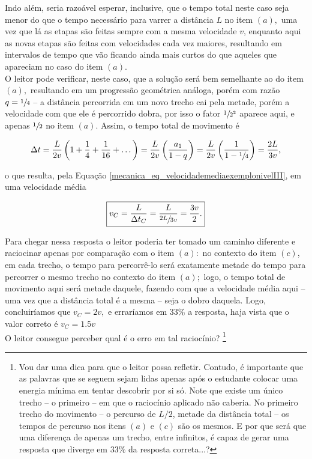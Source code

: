 \begin{exemplo}
\begin{itemize}
  Indo além, seria razoável esperar, inclusive, que o tempo total neste caso seja menor do que o tempo necessário para varrer a distância $L$ no item $(a),$ uma vez que lá as etapas são feitas sempre com a mesma velocidade $v$, enquanto aqui as novas etapas são feitas com velocidades cada vez maiores, resultando em intervalos de tempo que vão ficando ainda mais curtos do que aqueles que apareciam no caso do item $(a).$ \\

  O leitor pode verificar, neste caso, que a solução será bem semelhante ao do item $(a),$ resultando em um progressão geométrica análoga, porém com razão $q=\sfrac{1}{4}$ -- a distância percorrida em um novo trecho cai pela metade, porém a velocidade com que ele é percorrido dobra, por isso o fator $\sfrac{1}{2^2}$ aparece aqui, e apenas $\sfrac{1}{2}$ no item $(a)$. Assim, o tempo total de movimento é

  $$ \Delta t = \dfrac{L}{2v} \left(1+\dfrac{1}{4}+\dfrac{1}{16}+\dots \right) = \dfrac{L}{2v} \left( \dfrac{a_1}{1-q} \right) = \dfrac{L}{2v}\left( \dfrac{1}{1-\sfrac{1}{4}} \right) =  \dfrac{2L}{3v},$$

\noindent o que resulta, pela Equação \eqref{mecanica_eq_velocidademediaexemplonivelIII}, em uma velocidade média

$$ \boxed{ v_C = \dfrac{L}{\Delta t_C} = \dfrac{L}{\sfrac{2L}{3v}} = \dfrac{3v}{2}.}$$

Para chegar nessa resposta o leitor poderia ter tomado um caminho diferente e raciocinar apenas por comparação com o item $(a):$ no contexto do item $(c)$, em cada trecho, o tempo para percorrê-lo será exatamente metade do tempo para percorrer o mesmo trecho no contexto do item $(a);$ logo, o tempo total de movimento aqui será metade daquele, fazendo com que a velocidade média aqui -- uma vez que a distância total é a mesma -- seja o dobro daquela. Logo, concluiríamos que $v_C = 2v,$ e erraríamos em 33\% a resposta, haja vista que o valor correto é $v_C=1.5v$ \\

O leitor consegue perceber qual é o erro em tal raciocínio? \footnote{Vou dar uma dica para que o leitor possa refletir. Contudo, é importante que as palavras que se seguem sejam lidas apenas após o estudante colocar uma energia mínima em tentar descobrir por si só. Note que existe um único trecho -- o primeiro -- em que o raciocínio aplicado não caberia. No primeiro trecho do movimento -- o percurso de $L/2$, metade da distância total -- os tempos de percurso nos itens $(a)$ e $(c)$ são os mesmos. E por que será que uma diferença de apenas um trecho, entre infinitos, é capaz de gerar uma resposta que diverge em 33\% da resposta correta...?}
  
\end{itemize}





\end{exemplo}

